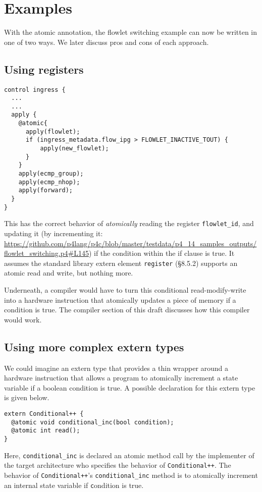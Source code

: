 \section{Examples}

With the atomic annotation, the flowlet switching example can now be written in
one of two ways. We later discuss pros and cons of each approach.

\subsection{Using registers}

\begin{verbatim}
control ingress {
  ...
  ...
  apply {
    @atomic{
      apply(flowlet);
      if (ingress_metadata.flow_ipg > FLOWLET_INACTIVE_TOUT) {
          apply(new_flowlet);
      }
    }
    apply(ecmp_group);
    apply(ecmp_nhop);
    apply(forward);
  }
}
\end{verbatim}

This has the correct behavior of \textit{atomically} reading the register
\texttt{flowlet\_id}, and updating it (by incrementing it:
\url{https://github.com/p4lang/p4c/blob/master/testdata/p4_14_samples_outputs/flowlet_switching.p4#L145})
if the condition within the if clause is true. It assumes the standard library
extern element \texttt{register} (\S8.5.2) supports an atomic read and write,
but nothing more.

Underneath, a compiler would have to turn this conditional read-modify-write
into a hardware instruction that atomically updates a piece of memory if a
condition is true. The compiler section of this draft discusses how this
compiler would work.

\subsection{Using more complex extern types}

We could imagine an extern type that provides a thin wrapper around a
hardware instruction that allows a program to atomically increment a state
variable if a boolean condition is true.  A possible declaration for this
extern type is given below.

\begin{verbatim}
extern Conditional++ {
  @atomic void conditional_inc(bool condition);
  @atomic int read();
}
\end{verbatim}

Here, \texttt{conditional\_inc} is declared an atomic method call by the
implementer of the target architecture who specifies the behavior of
\texttt{Conditional++}.  The behavior of \texttt{Conditional++}'s
\texttt{conditional\_inc} method is to atomically increment an internal state
variable if {\texttt condition} is true.

